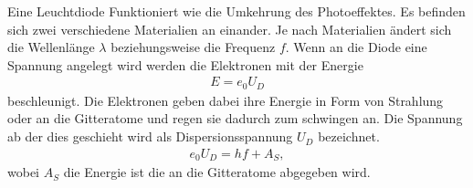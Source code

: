 Eine Leuchtdiode Funktioniert wie die Umkehrung des Photoeffektes. Es befinden sich zwei verschiedene Materialien an einander. Je nach Materialien ändert sich die Wellenlänge $\lambda$ beziehungsweise die Frequenz $f$. Wenn an die Diode eine Spannung angelegt wird werden die Elektronen mit der Energie
\begin{align}
E=e_0U_{D}
\end{align}
beschleunigt. Die Elektronen geben dabei ihre Energie in Form von Strahlung oder an die Gitteratome und regen sie dadurch zum schwingen an. Die Spannung ab der dies geschieht wird als Dispersionsspannung $U_{D}$ bezeichnet.
\begin{align}
e_0U_{D}=hf+A_S,
\end{align}
wobei $A_S$ die Energie ist die an die Gitteratome abgegeben wird.
